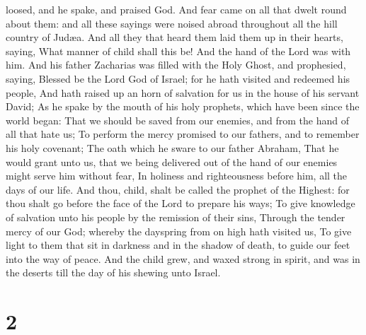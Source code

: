 loosed, and he spake, and praised God.  And fear came on
all that dwelt round about them: and all these sayings were noised
abroad throughout all the hill country of Judæa.  And all
they that heard them laid them up in their hearts, saying, What manner
of child shall this be! And the hand of the Lord was with him.
 And his father Zacharias was filled with the Holy Ghost,
and prophesied, saying,  Blessed be the Lord God of Israel;
for he hath visited and redeemed his people,  And hath
raised up an horn of salvation for us in the house of his servant David;
 As he spake by the mouth of his holy prophets, which have
been since the world began:  That we should be saved from
our enemies, and from the hand of all that hate us;  To
perform the mercy promised to our fathers, and to remember his holy
covenant;  The oath which he sware to our father Abraham,
 That he would grant unto us, that we being delivered out
of the hand of our enemies might serve him without fear, 
In holiness and righteousness before him, all the days of our life.
 And thou, child, shalt be called the prophet of the
Highest: for thou shalt go before the face of the Lord to prepare his
ways;  To give knowledge of salvation unto his people by
the remission of their sins,  Through the tender mercy of
our God; whereby the dayspring from on high hath visited us,
 To give light to them that sit in darkness and in the
shadow of death, to guide our feet into the way of peace. 
And the child grew, and waxed strong in spirit, and was in the deserts
till the day of his shewing unto Israel.

\hypertarget{section-1}{%
\section{2}\label{section-1}}

